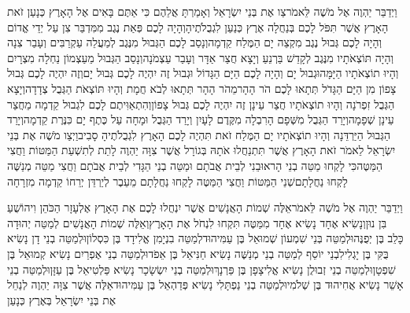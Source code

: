 \documentclass[../main/main.tex]{subfiles}
\begin{document}
\begin{multicols}{\ncols}
וַיְדַבֵּר יַהְוֶה אֶל מֹשֶׁה לֵּאמֹר\PreVerseSpace{}צַו אֶת בְּנֵי יִשְׂרָאֵל וְאָמַרְתָּ אֲלֵהֶם כִּי אַתֶּם בָּאִים אֶל הָאָרֶץ כְּנָעַן זֹאת הָאָרֶץ אֲשֶׁר תִּפֹּל לָכֶם בְּנַחֲלָה אֶרֶץ כְּנַעַן לִגְבֻלֹתֶיהָ\PreVerseSpace{}וְהָיָה לָכֶם פְּאַת נֶגֶב מִמִּדְבַּר צִן עַל יְדֵי אֱדוֹם וְהָיָה לָכֶם גְּבוּל נֶגֶב מִקְצֵה יָם הַמֶּלַח קֵדְמָה\PreVerseSpace{}וְנָסַב לָכֶם הַגְּבוּל מִנֶּגֶב לְמַעֲלֵה עַקְרַבִּים וְעָבַר צִנָה וְהָיָה תּוֹצְאֹתָיו מִנֶּגֶב לְקָדֵשׁ בַּרְנֵעַ וְיָצָא חֲצַר אַדָּר וְעָבַר עַצְמֹנָה\PreVerseSpace{}וְנָסַב הַגְּבוּל מֵעַצְמוֹן נַחְלָה מִצְרָיִם וְהָיוּ תוֹצְאֹתָיו הַיָּמָּה\PreVerseSpace{}וּגְבוּל יָם וְהָיָה לָכֶם הַיָּם הַגָּדוֹל וּגְבוּל זֶה יִהְיֶה לָכֶם גְּבוּל יָם\PreVerseSpace{}וְזֶה יִהְיֶה לָכֶם גְּבוּל צָפוֹן מִן הַיָּם הַגָּדֹל תְּתָאוּ לָכֶם הֹר הָהָר\PreVerseSpace{}מֵהֹר הָהָר תְּתָאוּ לְבֹא חֲמָת וְהָיוּ תּוֹצְאֹת הַגְּבֻל צְדָדָה\PreVerseSpace{}וְיָצָא הַגְּבֻל זִפְרֹנָה וְהָיוּ תוֹצְאֹתָיו חֲצַר עֵינָן זֶה יִהְיֶה לָכֶם גְּבוּל צָפוֹן\PreVerseSpace{}וְהִתְאַוִּיתֶם לָכֶם לִגְבוּל קֵדְמָה מֵחֲצַר עֵינָן שְׁפָמָה\PreVerseSpace{}וְיָרַד הַגְּבֻל מִשְּׁפָם הָרִבְלָה מִקֶּדֶם לָעָיִן וְיָרַד הַגְּבֻל וּמָחָה עַל כֶּתֶף יָם כִּנֶּרֶת קֵדְמָה\PreVerseSpace{}וְיָרַד הַגְּבוּל הַיַּרְדֵּנָה וְהָיוּ תוֹצְאֹתָיו יָם הַמֶּלַח זֹאת תִּהְיֶה לָכֶם הָאָרֶץ לִגְבֻלֹתֶיהָ סָבִיב\PreVerseSpace{}וַיְצַו מֹשֶׁה אֶת בְּנֵי יִשְׂרָאֵל לֵאמֹר זֹאת הָאָרֶץ אֲשֶׁר תִּתְנַחֲלוּ אֹתָהּ בְּגוֹרָל אֲשֶׁר צִוָּה יַהְוֶה לָתֵת לְתִשְׁעַת הַמַּטּוֹת וַחֲצִי הַמַּטֶּה\PreVerseSpace{}כִּי לָקְחוּ מַטֵּה בְנֵי הָראוּבֵנִי לְבֵית אֲבֹתָם וּמַטֵּה בְנֵי הַגָּדִי לְבֵית אֲבֹתָם וַחֲצִי מַטֵּה מְנַשֶּׁה לָקְחוּ נַחֲלָתָם\PreVerseSpace{}שְׁנֵי הַמַּטּוֹת וַחֲצִי הַמַּטֶּה לָקְחוּ נַחֲלָתָם מֵעֵבֶר לְיַרְדֵּן יְרֵחוֹ קֵדְמָה מִזְרָחָה\OpenSection{}\par
{}וַיְדַבֵּר יַהְוֶה אֶל מֹשֶׁה לֵּאמֹר\PreVerseSpace{}אֵלֶּה שְׁמוֹת הָאֲנָשִׁים אֲשֶׁר יִנְחֲלוּ לָכֶם אֶת הָאָרֶץ אֶלְעָזָר הַכֹּהֵן וִיהוֹשֻׁעַ בִּן נוּן\PreVerseSpace{}וְנָשִׂיא אֶחָד נָשִׂיא אֶחָד מִמַּטֶּה תִּקְחוּ לִנְחֹל אֶת הָאָרֶץ\PreVerseSpace{}וְאֵלֶּה שְׁמוֹת הָאֲנָשִׁים לְמַטֵּה יְהוּדָה כָּלֵב בֶּן יְפֻנֶּה\PreVerseSpace{}וּלְמַטֵּה בְּנֵי שִׁמְעוֹן שְׁמוּאֵל בֶּן עַמִּיהוּד\PreVerseSpace{}לְמַטֵּה בִנְיָמִן אֱלִידָד בֶּן כִּסְלוֹן\PreVerseSpace{}וּלְמַטֵּה בְנֵי דָן נָשִׂיא בֻּקִּי בֶּן יָגְלִי\PreVerseSpace{}לִבְנֵי יוֹסֵף לְמַטֵּה בְנֵי מְנַשֶּׁה נָשִׂיא חַנִּיאֵל בֶּן אֵפֹד\PreVerseSpace{}וּלְמַטֵּה בְנֵי אֶפְרַיִם נָשִׂיא קְמוּאֵל בֶּן שִׁפְטָן\PreVerseSpace{}וּלְמַטֵּה בְנֵי זְבוּלֻן נָשִׂיא אֱלִיצָפָן בֶּן פַּרְנָךְ\PreVerseSpace{}וּלְמַטֵּה בְנֵי יִשְׂשָׂכָר נָשִׂיא פַּלְטִיאֵל בֶּן עַזָּן\PreVerseSpace{}וּלְמַטֵּה בְנֵי אָשֵׁר נָשִׂיא אֲחִיהוּד בֶּן שְׁלֹמִי\PreVerseSpace{}וּלְמַטֵּה בְנֵי נַפְתָּלִי נָשִׂיא פְּדַהְאֵל בֶּן עַמִּיהוּד\PreVerseSpace{}אֵלֶּה אֲשֶׁר צִוָּה יַהְוֶה לְנַחֵל אֶת בְּנֵי יִשְׂרָאֵל בְּאֶרֶץ כְּנָעַן\OpenSection{}\par

\end{multicols}
\end{document}
